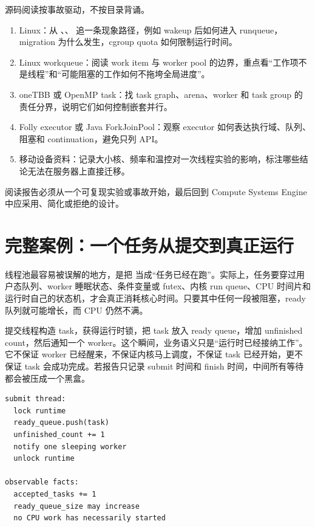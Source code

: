 \begin{sourcereadingbox}
源码阅读按事故驱动，不按目录背诵。
\begin{enumerate}
  \item Linux：从 、、 追一条现象路径，例如 wakeup 后如何进入 runqueue，migration 为什么发生，cgroup quota 如何限制运行时间。
  \item Linux workqueue：阅读 work item 与 worker pool 的边界，重点看“工作项不是线程”和“可能阻塞的工作如何不拖垮全局进度”。
  \item oneTBB 或 OpenMP task：找 task graph、arena、worker 和 task group 的责任分界，说明它们如何控制嵌套并行。
  \item Folly executor 或 Java ForkJoinPool：观察 executor 如何表达执行域、队列、阻塞和 continuation，避免只列 API。
  \item 移动设备资料：记录大小核、频率和温控对一次线程实验的影响，标注哪些结论无法在服务器上直接迁移。
\end{enumerate}
阅读报告必须从一个可复现实验或事故开始，最后回到 Compute Systems Engine 中应采用、简化或拒绝的设计。
\end{sourcereadingbox}

\section{完整案例：一个任务从提交到真正运行}

线程池最容易被误解的地方，是把  当成“任务已经在跑”。实际上，任务要穿过用户态队列、worker 睡眠状态、条件变量或 futex、内核 run queue、CPU 时间片和运行时自己的状态机，才会真正消耗核心时间。只要其中任何一段被阻塞，ready 队列就可能增长，而 CPU 仍然不满。

提交线程构造 task，获得运行时锁，把 task 放入 ready queue，增加 unfinished count，然后通知一个 worker。这个瞬间，业务语义只是“运行时已经接纳工作”。它不保证 worker 已经醒来，不保证内核马上调度，不保证 task 已经开始，更不保证 task 会成功完成。若报告只记录 submit 时间和 finish 时间，中间所有等待都会被压成一个黑盒。

\begin{lstlisting}[numbers=none,caption={submit 的状态变化}]
submit thread:
  lock runtime
  ready_queue.push(task)
  unfinished_count += 1
  notify one sleeping worker
  unlock runtime

observable facts:
  accepted_tasks += 1
  ready_queue_size may increase
  no CPU work has necessarily started
\end{lstlisting}


